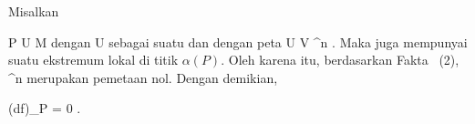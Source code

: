 Misalkan

\mavergleichskette
{\vergleichskette
{ P
}
{ \in }{  U
}
{ \subseteq }{ M
}
{    }{
}
{   }{
}
}
{}{}{}
dengan U sebagai suatu
dan dengan peta
\maabb {\alpha} { U } {V \subseteq \R^n
} {.}
Maka
 juga mempunyai suatu ekstremum lokal di titik $\alpha(P)$.
Oleh karena itu, berdasarkan
Fakta   (2),
 {\R^n } {\R
} {}
merupakan pemetaan nol. Dengan demikian,

\mavergleichskette
{\vergleichskette
{ (df)_P
}
{ = }{ 0
}
{  }{
}
{    }{
}
{   }{
}
}
{}{}{.}
